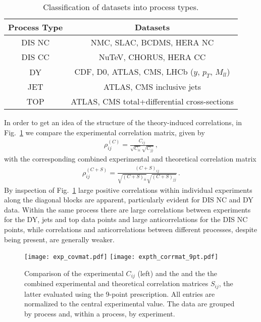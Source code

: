     \begin{table}[t]
        \centering
        \renewcommand*{\arraystretch}{1.3}
        \begin{tabular}{|c|c|}
          \hline
          Process Type  & Datasets \\
          \hline
          DIS NC  &   NMC, SLAC, BCDMS, HERA NC \\
          DIS CC  &   NuTeV, CHORUS, HERA CC \\
          DY  & CDF, D0, ATLAS, CMS, LHCb ($y$, $p_T$, $M_{ll}$) \\
          JET  & ATLAS, CMS inclusive jets \\
          TOP  & ATLAS, CMS total+differential cross-sections \\
          \hline
        \end{tabular}
        \caption{\label{eq:expclassification}
         Classification of  datasets into  process types.
        }
    \end{table}
    In order to get an idea of the structure of the theory-induced correlations,
    in Fig.~\ref{fig:covmats} we compare the experimental correlation matrix, given by
    \begin{align}
        \rho^{(C)}_{ij} = \frac{C_{ij}}{\sqrt{C_{ii}}\sqrt{C_{jj}}}\,,
    \end{align}
    with the corresponding combined experimental and theoretical correlation matrix
    \begin{align}
        \rho^{(C+S)}_{ij} = \frac{\left(C+S\right)_{ij}}{ \sqrt{\left(C+S\right)_{ii}} \sqrt{\left(C+S\right)_{jj}} }\,.
    \end{align}
    By inspection of Fig.~\ref{fig:covmats} large positive correlations within individual experiments along 
    the diagonal blocks are apparent, particularly evident for DIS NC and DY data.
    Within the same process there are large correlations between experiments for the DY, jets and top data points 
    and large anticorrelations for the DIS NC points, while correlations and anticorrelations between different processes,
    despite being present, are generally weaker.

    \begin{figure}[t!]
    \begin{center}
        \texttt{[image: exp\_covmat.pdf]}
        \texttt{[image: expth\_corrmat\_9pt.pdf]}
        \caption{\small Comparison of the  experimental $C_{ij}$ (left)
        and the and the the combined experimental and theoretical correlation matrices  $S_{ij}$, 
        the latter evaluated using the 9-point prescription.
        All entries are normalized to the central  experimental value.
        The data are grouped by process and, within a process, by experiment.} 
        \label{fig:covmats}     
    \end{center}
    \end{figure}

